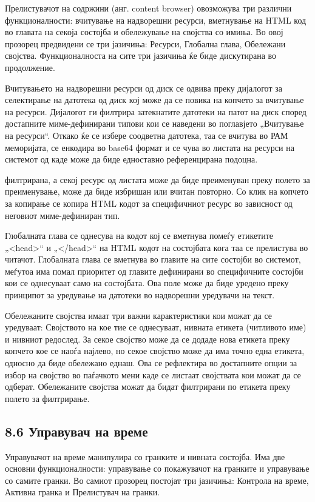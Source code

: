 Прелистувачот на содржини (анг. content browser) овозможува три различни функционалности: вчитување на надворешни ресурси, вметнување на HTML код во главата на секоја состојба и обележување на својства со имиња. Во овој прозорец предвидени се три јазичиња: Ресурси, Глобална глава, Обележани својства. Функционалноста на сите три јазичиња ќе биде дискутирана во продолжение.

Вчитувањето на надворешни ресурси од диск се одвива преку дијалогот за селектирање на датотека од диск кој може да се повика на копчето за вчитување на ресурси. Дијалогот ги филтрира затекнатите датотеки на патот на диск според достапните миме-дефинирани типови кои се наведени во поглавјето „Вчитување на ресурси“. Откако ќе се избере соодветна датотека, таа се вчитува во РАМ меморијата, се енкодира во base64 формат и се чува во листата на ресурси на системот од каде може да биде едноставно референцирана подоцна.


филтрирана, а секој ресурс од листата може да биде преименуван преку полето за преименување, може да биде избришан или вчитан повторно. Со клик на копчето за копирање се копира HTML кодот за специфичниот ресурс во зависност од неговиот миме-дефиниран тип.

Глобалната глава се однесува на кодот кој се вметнува помеѓу етикетите „<head>“ и „</head>“ на HTML кодот на состојбата кога таа се прелистува во читачот. Глобалната глава се вметнува во главите на сите состојби во системот, меѓутоа има помал приоритет од главите дефинирани во специфичните состојби кои се однесуваат само на состојбата. Ова поле може да биде уредено преку принципот за уредување на датотеки во надворешни уредувачи на текст.

Обележаните својства имаат три важни карактеристики кои можат да се уредуваат: Својството на кое тие се однесуваат, нивната етикета (читливото име) и нивниот редослед. За секое својство може да се додаде нова етикета преку копчето кое се наоѓа најлево, но секое својство може да има точно една етикета, односно да биде обележано еднаш. Ова се рефлектира во достапните опции за избор на својство во паѓачкото мени каде се листаат својствата кои можат да се одберат. Обележаните својства можат да бидат филтрирани по етикета преку полето за филтрирање.

\subsection{8.6 Управувач на време}

Управувачот на време манипулира со гранките и нивната состојба. Има две основни функционалности: управување со покажувачот на гранките и управување со самите гранки. Во самиот прозорец постојат три јазичиња: Контрола на време, Активна гранка и Прелистувач на гранки.

